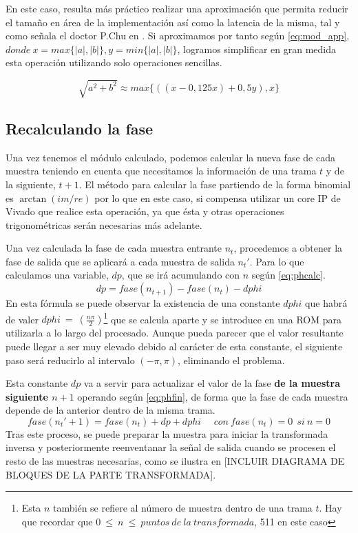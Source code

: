 En este caso, resulta más práctico realizar una aproximación que permita reducir el tamaño en área de la implementación así como la latencia de la misma, tal y como señala el doctor P.Chu en \cite{vhdlchu}. Si aproximamos por tanto según \ref{eq:mod_app}, $donde~x = max\{|a|,|b|\}, y = min\{|a|,|b|\}$, logramos simplificar en gran medida esta operación utilizando solo operaciones sencillas.

\begin{equation}
\label{eq:mod_app}
 \sqrt{a^{2}+b^{2}} \approx max\{((x - 0,125x) + 0,5y),x\}
\end{equation} 

\subsection{Recalculando la fase}
Una vez tenemos el módulo calculado, podemos calcular la nueva fase de cada muestra teniendo en cuenta que necesitamos la información de una trama $t$ y de la siguiente, $t+1$. El método para calcular la fase partiendo de la forma binomial es $\arctan(im/re)$ por lo que en este caso, si compensa utilizar un core IP de Vivado que realice esta operación, ya que ésta y otras operaciones trigonométricas serán necesarias más adelante.

Una vez calculada la fase de cada muestra entrante $n_{t}$, procedemos a obtener la fase de salida que se aplicará a cada muestra de salida $n_{t}'$. Para lo que calculamos una variable, $dp$, que se irá acumulando con $n$ según \ref{eq:phcalc}. 
\begin{equation}
\label{eq:phcalc}
dp = fase(n_{t+1}) - fase(n_{t}) - dphi
\end{equation} 
En esta fórmula se puede observar la existencia de una constante $dphi$ que habrá de valer $dphi~=~(\frac{n\pi}{2})$\footnote{Esta $n$ también se refiere al número de muestra dentro de una trama $t$. Hay que recordar que $0~\leq~n~\leq~puntos~de~la~transformada$, 511 en este caso} que se calcula aparte y se introduce en una ROM para utilizarla a lo largo del procesado. Aunque pueda parecer que el valor resultante puede llegar a ser muy elevado debido al carácter de esta constante, el siguiente paso será reducirlo al intervalo $(-\pi,\pi)$, eliminando el problema.

Esta constante $dp$ va a servir para actualizar el valor de la fase \textbf{de la muestra siguiente $n+1$} operando según \ref{eq:phfin}, de forma que la fase de cada muestra depende de la anterior dentro de la misma trama.
\begin{equation}
\label{eq:phfin}
fase(n_{t}' + 1) = fase(n_{t}) + dp + dphi~~~~~~con~fase(n_{t}) = 0~~si~n=0
\end{equation} 
Tras este proceso, se puede preparar la muestra para iniciar la transformada inversa y posteriormente reenventanar la señal de salida cuando se procesen el resto de las muestras necesarias, como se ilustra en [INCLUIR DIAGRAMA DE BLOQUES DE LA PARTE TRANSFORMADA].

